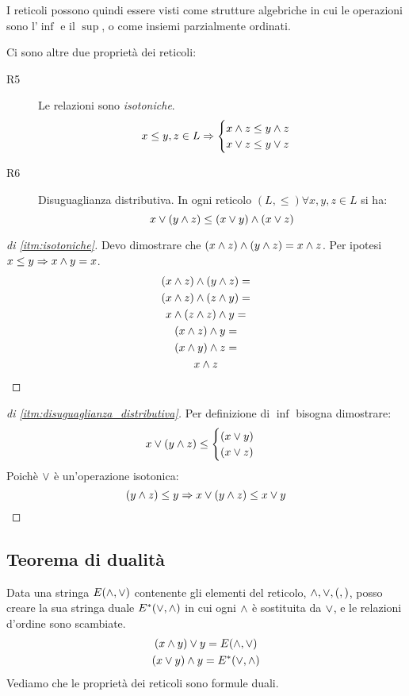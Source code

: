 I reticoli possono quindi essere visti come strutture algebriche in cui le operazioni sono l'$\inf$ e il $\sup$, o come insiemi parzialmente ordinati.

Ci sono altre due propriet\`a dei reticoli:
\begin{description}
  \item [R5\label{itm:isotoniche}] Le relazioni sono \textit{isotoniche}.
  \[
  x \le y, z \in L \Rightarrow 
  \begin{cases}
  x \wedge z \le y \wedge z \\ 
  x \vee z \le y \vee z
  \end{cases}
  \]
  \item [R6\label{itm:disuguaglianza_distributiva}] Disuguaglianza distributiva. In ogni reticolo $(L, \le) \forall x, y, z \in L $ si ha:
  \[
  x \vee (y \wedge z) \le (x \vee y) \wedge (x \vee z)
  \]
\end{description}

\begin{proof}[di \ref{itm:isotoniche}]
Devo dimostrare che $ (x \wedge z) \wedge (y \wedge z) = x \wedge z $.
Per ipotesi $x \le y \Rightarrow x \wedge y = x$.
\begin{multline*}
(x \wedge z) \wedge (y \wedge z) = \\
(x \wedge z) \wedge (z \wedge y) = \\
x \wedge (z \wedge z) \wedge y = \\
(x \wedge z) \wedge y = \\
(x \wedge y) \wedge z = \\
 x \wedge z
\end{multline*}
\end{proof}
\begin{proof}[di \ref{itm:disuguaglianza_distributiva}]
Per definizione di $\inf$ bisogna dimostrare:
\[
x \vee (y \wedge z) \le 
\begin{cases}
(x \vee y) \\
(x \vee z)
\end{cases}
\]
Poich\`e $\vee$ \`e un'operazione isotonica:
\[
(y \wedge z) \le y \Rightarrow x \vee (y \wedge z) \le x \vee y
\]
\end{proof}

\subsection{Teorema di dualit\`a}
Data una stringa $E(\wedge, \vee)$ contenente gli elementi del reticolo, $\wedge, \vee, (, )$, posso creare la sua stringa duale $E^{\ast} (\vee, \wedge)$ in cui ogni $\wedge$ \`e sostituita da $\vee$, e le relazioni d'ordine sono scambiate.
\begin{gather*}
(x \wedge y) \vee y = E(\wedge, \vee) \\
(x \vee y) \wedge y = E^{\ast} (\vee, \wedge)
\end{gather*}
Vediamo che le propriet\`a dei reticoli sono formule duali.

